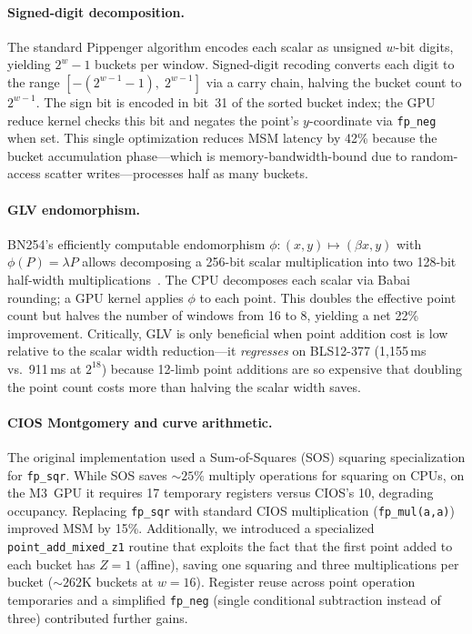 \paragraph{Signed-digit decomposition.}
The standard Pippenger algorithm encodes each scalar as unsigned $w$-bit digits,
yielding $2^w - 1$ buckets per window. Signed-digit recoding converts each digit
to the range $[{-}(2^{w-1}{-}1),\; 2^{w-1}]$ via a carry chain, halving the
bucket count to $2^{w-1}$. The sign bit is encoded in bit~31 of the sorted
bucket index; the GPU reduce kernel checks this bit and negates the point's
$y$-coordinate via \texttt{fp\_neg} when set. This single optimization reduces
MSM latency by 42\% because the bucket accumulation phase---which is
memory-bandwidth-bound due to random-access scatter writes---processes half as
many buckets.

\paragraph{GLV endomorphism.}
BN254's efficiently computable endomorphism $\phi: (x, y) \mapsto (\beta x, y)$
with $\phi(P) = \lambda P$ allows decomposing a 256-bit scalar multiplication
into two 128-bit half-width multiplications~\cite{gallant-lambert-vanstone}. The
CPU decomposes each scalar via Babai rounding; a GPU kernel applies $\phi$ to
each point. This doubles the effective point count but halves the number of
windows from 16 to 8, yielding a net 22\% improvement. Critically, GLV is only
beneficial when point addition cost is low relative to the scalar width
reduction---it \emph{regresses} on BLS12-377 (1{,}155\,ms vs.\ 911\,ms at
$2^{18}$) because 12-limb point additions are so expensive that doubling the
point count costs more than halving the scalar width saves.

\paragraph{CIOS Montgomery and curve arithmetic.}
The original implementation used a Sum-of-Squares (SOS) squaring specialization
for \texttt{fp\_sqr}. While SOS saves ${\sim}25\%$ multiply operations for
squaring on CPUs, on the M3~GPU it requires 17 temporary registers versus CIOS's
10, degrading occupancy. Replacing \texttt{fp\_sqr} with standard CIOS
multiplication (\texttt{fp\_mul(a,a)}) improved MSM by 15\%. Additionally, we
introduced a specialized \texttt{point\_add\_mixed\_z1} routine that exploits
the fact that the first point added to each bucket has $Z = 1$ (affine),
saving one squaring and three multiplications per bucket (${\sim}262$K buckets at
$w{=}16$). Register reuse across point operation temporaries and a simplified
\texttt{fp\_neg} (single conditional subtraction instead of three) contributed
further gains.

